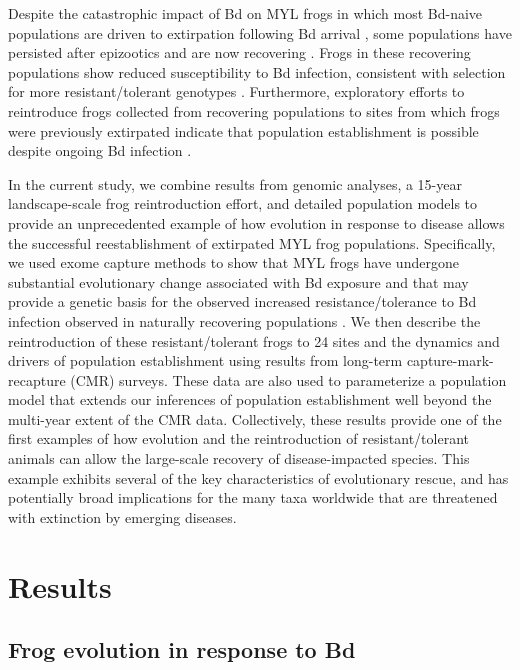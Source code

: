 \documentclass[9pt,twocolumn,twoside,lineno]{pnas-new}
\begin{document}
Despite the catastrophic impact of Bd on MYL frogs in which most
Bd-naive populations are driven to extirpation following Bd arrival
\citep{vredenburg2010}, some populations have persisted after epizootics
\citep{briggs2010} and are now recovering \citep{knapp2016}. Frogs in
these recovering populations show reduced susceptibility to Bd
infection, consistent with selection for more resistant/tolerant
genotypes \citep{knapp2016}. Furthermore, exploratory efforts to
reintroduce frogs collected from recovering populations to sites from
which frogs were previously extirpated indicate that population
establishment is possible despite ongoing Bd infection
\citep{joseph2018}.

In the current study, we combine results from genomic analyses, a
15-year landscape-scale frog reintroduction effort, and detailed
population models to provide an unprecedented example of how evolution
in response to disease allows the successful reestablishment of
extirpated MYL frog populations. Specifically, we used exome capture
methods to show that MYL frogs have undergone substantial evolutionary
change associated with Bd exposure and that may provide a genetic basis
for the observed increased resistance/tolerance to Bd infection observed
in naturally recovering populations \citep{knapp2016}. We then describe
the reintroduction of these resistant/tolerant frogs to 24 sites and the
dynamics and drivers of population establishment using results from
long-term capture-mark-recapture (CMR) surveys. These data are also used
to parameterize a population model that extends our inferences of
population establishment well beyond the multi-year extent of the CMR
data. Collectively, these results provide one of the first examples of
how evolution and the reintroduction of resistant/tolerant animals can
allow the large-scale recovery of disease-impacted species. This example
exhibits several of the key characteristics of evolutionary rescue, and
has potentially broad implications for the many taxa worldwide that are
threatened with extinction by emerging diseases.

\section*{Results}

\subsection*{Frog evolution in response to Bd}
\end{document}
